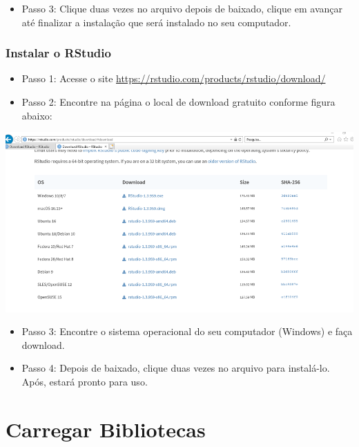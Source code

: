 \documentclass[
  brazil,
]{book}
\providecommand{\tightlist}{%
  \setlength{\itemsep}{0pt}\setlength{\parskip}{0pt}}
\begin{document}
\begin{itemize}
\tightlist
\item
  Passo 3: Clique duas vezes no arquivo depois de baixado, clique em avançar até finalizar a instalação que será instalado no seu computador.
\end{itemize}

\hypertarget{instalar-o-rstudio-2}{%
\subsection{Instalar o RStudio}\label{instalar-o-rstudio-2}}

\begin{itemize}
\tightlist
\item
  Passo 1: Acesse o site \url{https://rstudio.com/products/rstudio/download/}\\
\item
  Passo 2: Encontre na página o local de download gratuito conforme figura abaixo:
\end{itemize}

\includegraphics[width=13.54in]{img/inst_1_rstudio}

\begin{itemize}
\tightlist
\item
  Passo 3: Encontre o sistema operacional do seu computador (Windows) e faça download.
\item
  Passo 4: Depois de baixado, clique duas vezes no arquivo para instalá-lo. Após, estará pronto para uso.
\end{itemize}

\hypertarget{carregar-bibliotecas}{%
\chapter{Carregar Bibliotecas}\label{carregar-bibliotecas}}
\end{document}
